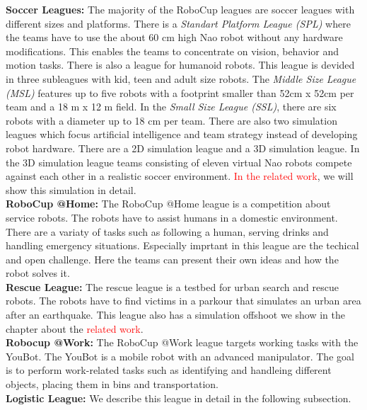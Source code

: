 \textbf{Soccer Leagues:} The majority of the RoboCup leagues are soccer leagues with different sizes and platforms. There is a \textit{Standart Platform League (SPL)} where the teams have to use the about 60 cm high Nao robot without any hardware modifications. This enables the teams to concentrate on vision, behavior and motion tasks. There is also a league for humanoid robots. This league is devided in three subleagues with kid, teen and adult size robots. The \textit{Middle Size League (MSL)} features up to five robots with a footprint smaller than 52cm x 52cm per team and a 18 m x 12 m field. In the \textit{Small Size League (SSL)}, there are six robots with a diameter up to 18 cm per team. There are also two simulation leagues which focus artificial intelligence and team strategy instead of developing robot hardware. There are a 2D simulation league and a 3D simulation league. In the 3D simulation league teams consisting of eleven virtual Nao robots compete against each other in a realistic soccer environment. \textcolor{red}{In the related work}, we will show this simulation in detail.\\
\textbf{RoboCup @Home:} The RoboCup @Home league is a competition about service robots. The robots have to assist humans in a domestic environment. There are a variaty of tasks such as following a human, serving drinks and handling emergency situations. Especially imprtant in this league are the techical and open challenge. Here the teams can present their own ideas and how the robot solves it.\\
\textbf{Rescue League:} The rescue league is a testbed for urban search and rescue robots. The robots have to find victims in a parkour that simulates an urban area after an earthquake. This league also has a simulation offshoot we show in the chapter about the \textcolor{red}{related work}.\\
\textbf{Robocup @Work:} The RoboCup @Work league targets working tasks with the YouBot. The YouBot is a mobile robot with an advanced manipulator. The goal is to perform work-related tasks such as identifying and handleing different objects, placing them in bins and transportation.\\
\textbf{Logistic League:} We describe this league in detail in the following subsection.\\

